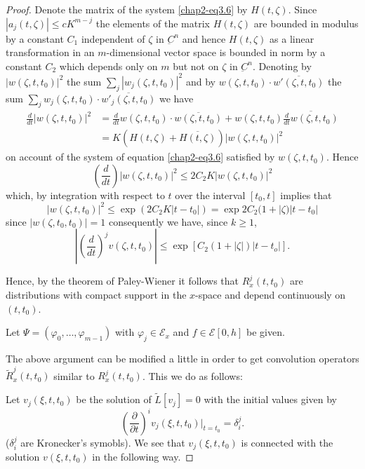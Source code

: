 \begin{proof}
Denote the matrix of the system \eqref{chap2-eq3.6} by $H(t,
\zeta)$. Since $|a_j(t,\zeta)| \leq c K^{m-j}$ the elements of the matrix $H(t, \zeta)$ are
bounded in modulus by a constant $C_1$ independent of $\zeta$ in
$\underbar{C}^n$ and hence $H(t, \zeta)$ as a linear transformation in
an $m$-dimensional vector space is bounded in norm by a constant $C_2$
which depends only on $m$ but not on $\zeta$ in
$\underbar{C}^n$. Denoting by $|w (\zeta, t, t_0)|^2$ the sum
$\sum\limits_{j} |w_j(\zeta, t, t_0)|^2$ and by $w(\zeta,
  t, t_0) \cdot \overline{w' (\zeta, t, t_0)}$ the sum
    $\sum\limits_{j} w_j (\zeta, t, t_0)\cdot 
\overline{w'_j (\zeta, t, t_0)}$ we have  
\begin{align*}
\frac{d}{dt} | w (\zeta,  t, t_0) |^2 &= \frac{d}{dt} w (\zeta,  t,
t_0)\cdot \overline{w (\zeta,  t, t_0)} + w (\zeta ,  t,  t_0)
\overline{\frac{d}{dt} w(\zeta,  t, t_0)}\\ 
&= K(H(t, \zeta ) + \overline{H(t, \zeta )})| w (\zeta, t, t_0)|^2 
\end{align*}
on account of the system of equation \eqref{chap2-eq3.6} satisfied by $w(\zeta, t,
t_0)$. Hence\pageoriginale  
$$
\left(\frac{d}{dt}\right) | w(\zeta,  t, t_0) |^2 \leq 2 C_2 K| w (\zeta,  t,
t_0)|^2 
$$
which, by integration with respect to $t$ over the interval $[t_0,
  t]$ implies that  
$$
|w (\zeta, t, t_0)|^2 \leq \exp (2 C_2 K| t-t_0|) = \exp 2C_2
(1+|\zeta)|t-t_0|  
$$
since $|w (\zeta,  t_0, t_0)|=1$ consequently we have, since $k\geq
1$,   
$$
\left| \left(\frac{d}{dt}\right)^j v(\zeta,  t,  t_0 ) \right| \leq
\exp [C_2 (1+|\zeta|)| t-t_o |]. 
$$

Hence,  by the theorem of Paley-Wiener it follows that $R^j_x (t, 
t_0)$ are distributions with compact support in the $x$-space and depend
continuously on $(t, t_0)$. 

Let $\Psi = (\varphi_0, \ldots , \varphi_{m-1})$ with $\varphi_j \in
\mathscr{E}_x$ and $f \in \mathscr{E} [0, h]$ be given. 

The above argument can be modified a little in order to get
convolution operators $\tilde{R}^j_x (t, t_0)$ similar to $R^j_x(t,
t_0)$. This we do as follows:   

Let $v_j (\xi, t, t_0)$ be the solution of $\tilde{L}[v_j] = 0$ with
the initial values given by  
$$
\left(\frac{\partial}{\partial t}\right)^i v_j (\xi, t, t_0)
\big|_{t=t_0} = \delta^j_i. 
$$ 
($\delta^j_i$ are Kronecker's symobls). We see that $v_j (\xi, t,
t_0)$ is connected with the solution $v (\xi, t, t_0)$ in the
following way. 


\end{proof}
